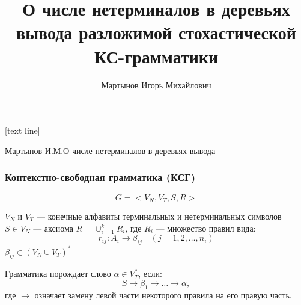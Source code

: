 \documentclass{beamer}
\title{О числе нетерминалов в деревьях вывода разложимой стохастической КС-грамматики}
\author{Мартынов Игорь Михайлович}
\begin{document}
	
	\titlepage
	
%		
%		
%	
%			
%			
	
	[text line]
	{
		\parbox{\linewidth}{\vspace*{-8pt} \color{gray} Мартынов И.М.\hfill О числе нетерминалов в деревьях вывода \hfill\insertpagenumber}
	}

	\begin{frame}
		\frametitle{Контекстно-свободная грамматика (КСГ)}
		$$
			G = <V_N, V_T, S, R>
		$$
		
		$V_N$ и $V_T$ --- конечные алфавиты терминальных и нетерминальных символов
		$S \in V_N$ --- аксиома
		$R = \cup_{i=1}^k R_i$, где $R_i$ --- множество правил вида:
		\begin{equation*}
		r_{ij} : A_i \rightarrow \beta_{ij}\quad (j = 1,2,\ldots,n_i)
		\end{equation*}
		$\beta_{ij} \in (V_N \cup V_T)^*$
		
		Грамматика порождает слово $\alpha \in V_T^*$, если:
		$$
			S \rightarrow \beta_1 \rightarrow \ldots \rightarrow \alpha,
		$$
		где $\rightarrow$ означает замену левой части некоторого правила на его правую часть.
	\end{frame}
\end{document}
